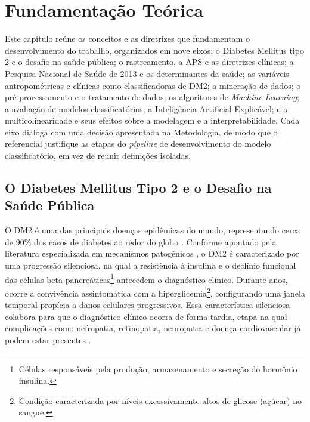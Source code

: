\chapter{Fundamentação Teórica}\label{cap:fundamentacao}
Este capítulo reúne os conceitos e as diretrizes que fundamentam o desenvolvimento do trabalho, organizados em nove eixos: o Diabetes Mellitus tipo 2 e o desafio na saúde pública; o rastreamento, a APS e as diretrizes clínicas; a Pesquisa Nacional de Saúde de 2013 e os determinantes da saúde; as variáveis antropométricas e clínicas como classificadoras de DM2; a mineração de dados; o pré-processamento e o tratamento de dados; os algoritmos de \textit{Machine Learning}; a avaliação de modelos classificatórios; a Inteligência Artificial Explicável; e a multicolinearidade e seus efeitos sobre a modelagem e a interpretabilidade. Cada eixo dialoga com uma decisão apresentada na Metodologia, de modo que o referencial justifique as etapas do \textit{pipeline} de desenvolvimento do modelo classificatório, em vez de reunir definições isoladas.

\section{O Diabetes Mellitus Tipo 2 e o Desafio na Saúde Pública} \label{sec:dm2-desafio}

O DM2 é uma das principais doenças epidêmicas do mundo, representando cerca de 90\% dos casos de diabetes ao redor do globo \cite{who2024diabetes}. Conforme apontado pela literatura especializada em mecanismos patogênicos \cite{mlynarska2025type}, o DM2 é caracterizado por uma progressão silenciosa, na qual a resistência à insulina e o declínio funcional das células beta-pancreáticas\footnote{Células responsáveis pela produção, armazenamento e secreção do hormônio insulina.} antecedem o diagnóstico clínico. Durante anos, ocorre a convivência assintomática com a hiperglicemia\footnote{Condição caracterizada por níveis excessivamente altos de glicose (açúcar) no sangue.}, configurando uma janela temporal propícia a danos celulares progressivos. Essa característica silenciosa colabora para que o diagnóstico clínico ocorra de forma tardia, etapa na qual complicações como nefropatia, retinopatia, neuropatia e doença cardiovascular já podem estar presentes \cite{mlynarska2025type}. 

